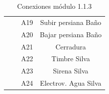 \begin{flushleft}
\begin{table}[H]
{\begin{tabular}{|c|c|c|c|}
 &  & A19 & Subir persiana Baño  \\ \cline{3-4} \rule[0mm]{0mm}{4mm}
 &  & A20 & Bajar persiana Baño  \\ \cline{3-4} \rule[0mm]{0mm}{4mm}
 &  & A21 & Cerradura            \\ \cline{3-4}\rule[0mm]{0mm}{4mm} 
 &  & A22 & Timbre Silva         \\ \cline{3-4}\rule[0mm]{0mm}{4mm} 
 &  & A23 & Sirena Silva         \\ \cline{3-4} \rule[0mm]{0mm}{4mm}
 &  & A24 & Electrov. Agua Silva \\ \hline
\end{tabular}
}
\caption{Conexiones módulo 1.1.3}
\label{tab:conex_3}
\end{table}
\end{flushleft}

